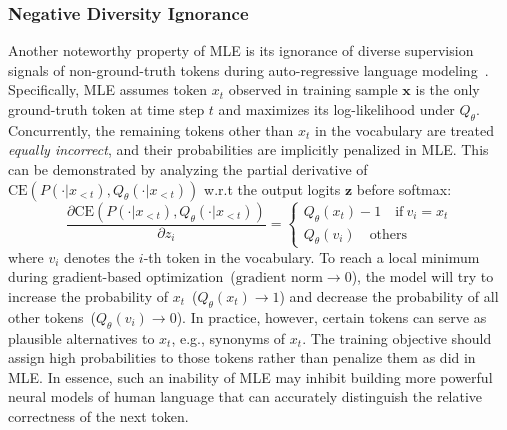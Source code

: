 \subsubsection{Negative Diversity Ignorance}
Another noteworthy property of MLE is its ignorance of diverse supervision signals of non-ground-truth tokens during auto-regressive language modeling~\cite{zhang2018minimum,li2019data}. Specifically, MLE assumes token $x_t$ observed in training sample $\bm{x}$ is the only ground-truth token at time step $t$ and maximizes its log-likelihood under $Q_{\theta}$. Concurrently, the remaining tokens other than $x_t$ in the vocabulary are treated \textit{equally incorrect}, and their probabilities are implicitly penalized in MLE. This can be demonstrated by analyzing the partial derivative of $\text{CE}(P(\cdot|x_{<t}),Q_{\theta}(\cdot|x_{<t}))$ w.r.t the output logits $\bm{z}$ before softmax:
\begin{equation}
    \frac{\partial \text{CE}(P(\cdot|x_{<t}),Q_{\theta}(\cdot|x_{<t}))}{\partial z_i}=
    \begin{cases}
        Q_{\theta}(x_t)-1 \quad \text{if}~v_i = x_t\\
        Q_{\theta}(v_i) \quad \text{others}
    \end{cases}
\end{equation}
where $v_i$ denotes the $i$-th token in the vocabulary. To reach a local minimum during gradient-based optimization~($\text{gradient norm}\to0$), the model will try to increase the probability of $x_t$~($Q_{\theta}(x_t)\to1$) and decrease the probability of all other tokens~($Q_{\theta}(v_i)\to0$). In practice, however, certain tokens can serve as plausible alternatives to $x_t$, e.g., synonyms of $x_t$. The training objective should assign high probabilities to those tokens rather than penalize them as did in MLE. In essence, such an inability of MLE may inhibit building more powerful neural models of human language that can accurately distinguish the relative correctness of the next token.

